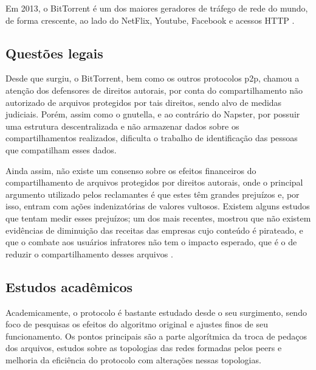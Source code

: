 Em 2013, o BitTorrent é um dos maiores geradores de tráfego de rede do mundo, de forma
crescente, ao lado do NetFlix, Youtube, Facebook e acessos HTTP
\cite{report:internet-usage-2013}.

\subsection*{Questões legais}

Desde que surgiu, o BitTorrent, bem como os outros protocolos \gls*{p2p}, chamou a
atenção dos defensores de direitos autorais, por conta do compartilhamento não
autorizado de arquivos protegidos por tais direitos, sendo alvo de medidas judiciais.
Porém, assim como o \gls*{gnutella}, e ao contrário do Napster, por possuir uma
estrutura descentralizada e não armazenar dados sobre os compartilhamentos realizados,
dificulta o trabalho de identificação das pessoas que compatilham esses dados.

Ainda assim, não existe um consenso sobre os efeitos financeiros do compartilhamento de
arquivos protegidos por direitos autorais, onde o principal argumento utilizado pelos
reclamantes é que estes têm grandes prejuízos e, por isso, entram com ações
indenizatórias de valores vultosos. Existem alguns estudos que tentam medir esses
prejuízos; um dos mais recentes, mostrou que não existem evidências de diminuição das
receitas das empresas cujo conteúdo é pirateado, e que o combate aos usuários
infratores não tem o impacto esperado, que é o de reduzir o compartilhamento desses
arquivos \cite{report:lse-piracy}.

\subsection*{Estudos acadêmicos}

Academicamente, o protocolo é bastante estudado desde o seu surgimento, sendo foco de
pesquisas os efeitos do algoritmo original e ajustes finos de seu funcionamento. Os
pontos principais são a parte algorítmica da troca de pedaços dos arquivos, estudos
sobre as topologias das redes formadas pelos \glspl*{peer} e melhoria da eficiência
do protocolo com alterações nessas topologias.

\afterpage{\clearpage}
